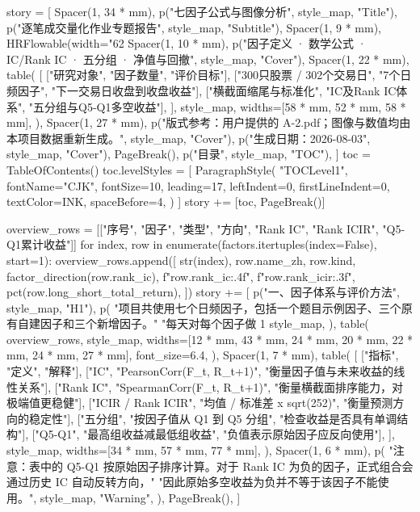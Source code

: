 \documentclass[UTF8,a4paper,fontset=fandol]{ctexart}
\begin{document}
\begin{ProjectCode}
    story = [
        Spacer(1, 34 * mm),
        p("七因子公式与图像分析", style_map, "Title"),
        p("逐笔成交量化作业专题报告", style_map, "Subtitle"),
        Spacer(1, 9 * mm),
        HRFlowable(width="62%
        Spacer(1, 10 * mm),
        p("因子定义 · 数学公式 · IC/Rank IC · 五分组 · 净值与回撤", style_map, "Cover"),
        Spacer(1, 22 * mm),
        table(
            [
                ["研究对象", "因子数量", "评价目标"],
                ["300只股票 / 302个交易日", "7个日频因子", "下一交易日收盘到收盘收益"],
                ["横截面缩尾与标准化", "IC及Rank IC体系", "五分组与Q5-Q1多空收益"],
            ],
            style_map,
            widths=[58 * mm, 52 * mm, 58 * mm],
        ),
        Spacer(1, 27 * mm),
        p("版式参考：用户提供的 A-2.pdf；图像与数值均由本项目数据重新生成。", style_map, "Cover"),
        p("生成日期：2026-08-03", style_map, "Cover"),
        PageBreak(),
        p("目录", style_map, "TOC"),
    ]
    toc = TableOfContents()
    toc.levelStyles = [
        ParagraphStyle(
            "TOCLevel1",
            fontName="CJK",
            fontSize=10,
            leading=17,
            leftIndent=0,
            firstLineIndent=0,
            textColor=INK,
            spaceBefore=4,
        )
    ]
    story += [toc, PageBreak()]

    overview_rows = [["序号", "因子", "类型", "方向", "Rank IC", "Rank ICIR", "Q5-Q1累计收益"]]
    for index, row in enumerate(factors.itertuples(index=False), start=1):
        overview_rows.append([
            str(index),
            row.name_zh,
            row.kind,
            factor_direction(row.rank_ic),
            f"{row.rank_ic:.4f}",
            f"{row.rank_icir:.3f}",
            pct(row.long_short_total_return),
        ])
    story += [
        p("一、因子体系与评价方法", style_map, "H1"),
        p(
            "项目共使用七个日频因子，包括一个题目示例因子、三个原有自建因子和三个新增因子。"
            "每天对每个因子做 1%
            style_map,
        ),
        table(
            overview_rows,
            style_map,
            widths=[12 * mm, 43 * mm, 24 * mm, 20 * mm, 22 * mm, 24 * mm, 27 * mm],
            font_size=6.4,
        ),
        Spacer(1, 7 * mm),
        table(
            [
                ["指标", "定义", "解释"],
                ["IC", "PearsonCorr(F_t, R_t+1)", "衡量因子值与未来收益的线性关系"],
                ["Rank IC", "SpearmanCorr(F_t, R_t+1)", "衡量横截面排序能力，对极端值更稳健"],
                ["ICIR / Rank ICIR", "均值 / 标准差 x sqrt(252)", "衡量预测方向的稳定性"],
                ["五分组", "按因子值从 Q1 到 Q5 分组", "检查收益是否具有单调结构"],
                ["Q5-Q1", "最高组收益减最低组收益", "负值表示原始因子应反向使用"],
            ],
            style_map,
            widths=[34 * mm, 57 * mm, 77 * mm],
        ),
        Spacer(1, 6 * mm),
        p(
            "注意：表中的 Q5-Q1 按原始因子排序计算。对于 Rank IC 为负的因子，正式组合会通过历史 IC 自动反转方向，"
            "因此原始多空收益为负并不等于该因子不能使用。",
            style_map,
            "Warning",
        ),
        PageBreak(),
    ]


\end{ProjectCode}
\end{document}
